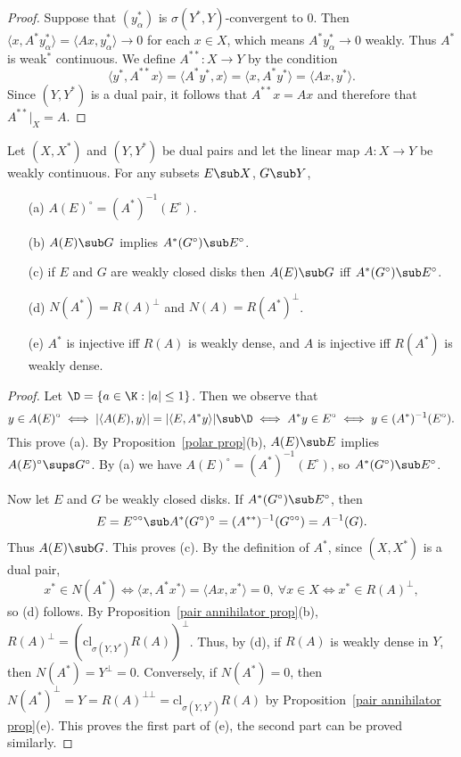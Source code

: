 \begin{proof}
Suppose that $(y^*_\alpha)$ is $\sigma(Y^*,Y)$-convergent to $0$. Then $\langle x,A^*y^*_\alpha\rangle=\langle Ax,y^*_\alpha\rangle\to 0$ for each $x\in X$, which means $A^*y^*_\alpha\to 0$ weakly. Thus $A^*$ is weak$^*$ continuous. We define $A^{**}:X\to Y$ by the condition
\[\langle y^*,A^{**}x\rangle=\langle A^*y^*,x\rangle=\langle x,A^*y^*\rangle=\langle Ax,y^*\rangle.\]
Since $(Y,Y^*)$ is a dual pair, it follows that $A^{**}x=Ax$ and therefore that $A^{**}|_X=A$.
\end{proof}
\begin{proposition}\label{polar and adjoint}
Let $(X,X^*)$ and $(Y,Y^*)$ be dual pairs and let the linear map $A:X\to Y$ be weakly continuous. For any subsets $E\sub X$, $G\sub Y$,
\begin{itemize}
\item[(a)] $A(E)^\circ=(A^*)^{-1}(E^\circ)$.
\item[(b)] $A(E)\sub G$ implies $A^*(G^\circ)\sub E^\circ$.
\item[(c)] if $E$ and $G$ are weakly closed disks then $A(E)\sub G$ iff $A^*(G^\circ)\sub E^\circ$. 
\item[(d)] $N(A^*)=R(A)^\bot$ and $N(A)=R(A^*)^\bot$.
\item[(e)] $A^*$ is injective iff $R(A)$ is weakly dense, and $A$ is injective iff $R(A^*)$ is weakly dense. 
\end{itemize}
\end{proposition}
\begin{proof}
Let $\D=\{a\in\K:|a|\leq 1\}$. Then we observe that
\[y\in A(E)^\circ\iff |\langle A(E),y\rangle|=|\langle E,A^*y\rangle|\sub \D\iff A^*y\in E^\circ\iff y\in (A^*)^{-1}(E^\circ).\]
This prove (a). By Proposition~\ref{polar prop}(b), $A(E)\sub E$ implies $A(E)^\circ\sups G^\circ$. By (a) we have $A(E)^\circ=(A^*)^{-1}(E^\circ)$, so $A^*(G^\circ)\sub E^\circ$.\par
Now let $E$ and $G$ be weakly closed disks. If $A^*(G^\circ)\sub E^\circ$, then
\[E=E^{\circ\circ}\sub A^*(G^\circ)^\circ=(A^{**})^{-1}(G^{\circ\circ})=A^{-1}(G).\]
Thus $A(E)\sub G$. This proves (c). By the definition of $A^*$, since $(X,X^*)$ is a dual pair,
\[x^*\in N(A^*)\iff\langle x,A^*x^*\rangle=\langle Ax,x^*\rangle=0,\ \forall x\in X\iff x^*\in R(A)^\bot,\]
so (d) follows. By Proposition~\ref{pair annihilator prop}(b), $R(A)^\bot=(\mathrm{cl}_{\sigma(Y,Y^*)}R(A))^\bot$. Thus, by (d), if $R(A)$ is weakly dense in $Y$, then $N(A^*)=Y^\bot=0$. Conversely, if $N(A^*)=0$, then $N(A^*)^\bot=Y=R(A)^{\bot\bot}=\mathrm{cl}_{\sigma(Y,Y^*)}R(A)$ by Proposition~\ref{pair annihilator prop}(e). This proves the first part of (e), the second part can be proved similarly.
\end{proof}
